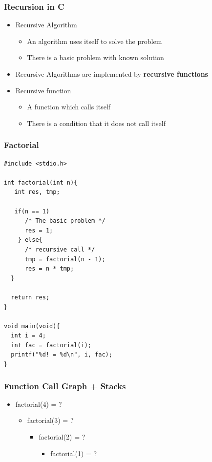 \documentclass{../c-lecture}
\begin{document}
\begin{frame}
  \frametitle{Recursion in C}
  \begin{itemize}
    \item Recursive Algorithm
    \begin{itemize}
      \item An algorithm uses itself to solve the problem
      \item There is a basic problem with known solution
    \end{itemize}
    \item
      Recursive Algorithms are implemented by
      \textbf{\color{Orange} recursive functions}

    \item Recursive function
    \begin{itemize}
      \item A function which calls itself
      \item There is a condition that it does not call itself
    \end{itemize}
  \end{itemize}
\end{frame}

\begin{frame}[fragile]
  \frametitle{Factorial}
  \begin{verbatim}
#include <stdio.h>

int factorial(int n){
   int res, tmp;

   if(n == 1)
      /* The basic problem */
      res = 1;
    } else{
      /* recursive call */
      tmp = factorial(n - 1);
      res = n * tmp;
  }

  return res;
}

void main(void){
  int i = 4;
  int fac = factorial(i);
  printf("%d! = %d\n", i, fac);
}
  \end{verbatim}
\end{frame}

\begin{frame}
  \frametitle{Function Call Graph + Stacks}
  \begin{itemize}
    \item factorial(4) = ?
    \begin{itemize}
      \item factorial(3) = ?
      \begin{itemize}
        \item factorial(2) = ?
        \begin{itemize}
          \item factorial(1) = ?
        \end{itemize}
      \end{itemize}
    \end{itemize}
  \end{itemize}
\end{frame}
\end{document}
